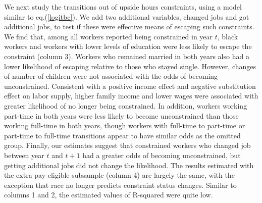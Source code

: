 We next study the transitions out of upside hours constraints, using a model similar to eq.(\ref{logitbc}). We add two additional variables, changed jobs and got additional jobs, to test if these were effective means of escaping such constraints.  We find that, among all workers reported being constrained in year $t$, black workers and workers with lower levels of education were less likely to escape the constraint (column 3).  Workers who remained married in both years also had a lower likelihood of escaping relative to those who stayed single. However, changes of number of children were not associated with the odds of becoming unconstrained. Consistent with a positive income effect and negative substitution effect on labor supply, higher family income and lower wages were associated with greater likelihood of no longer being constrained. In addition, workers working part-time in both years were less likely to become unconstrained than those working full-time in both years, though workers with full-time to part-time or part-time to full-time transitions appear to have similar odds as the omitted group.  Finally, our estimates suggest that constrained workers who changed job between year $t$ and $t+1$ had a greater odds of becoming unconstrained, but getting additional jobs did not change the likelihood.  The results estimated with the extra pay-eligible subsample (column 4) are largely the same, with the exception that race no longer predicts constraint status changes.  Similar to columns 1 and 2, the estimated values of R-squared were quite low.       